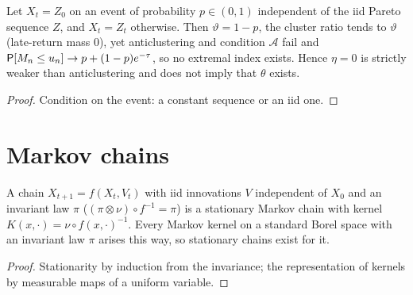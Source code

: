 \begin{proposition}
  \label{prop:mixture}
  \leanok
  Let $X_t = Z_0$ on an event of probability $p \in (0,1)$ independent of the iid Pareto sequence $Z$, and $X_t = Z_t$
  otherwise. Then $\vartheta = 1 - p$, the cluster ratio tends to $\vartheta$ (late-return mass $0$), yet anticlustering and
  condition $\mathcal A$ fail and $\mathsf{P}[M_n \le u_n] \to p + (1-p)e^{-\tau}$, so no extremal index exists. Hence $\eta = 0$ is
  strictly weaker than anticlustering and does not imply that $\theta$ exists.
\end{proposition}
\begin{proof}
  \leanok
  Condition on the event: a constant sequence or an iid one.
\end{proof}

\section{Markov chains}

\begin{theorem}
  \label{thm:markov-chain}
  \leanok
  A chain $X_{t+1} = f(X_t, V_t)$ with iid innovations $V$ independent of $X_0$ and an invariant law $\pi$ ($(\pi \otimes \nu)
  \circ f^{-1} = \pi$) is a stationary Markov chain with kernel $K(x, \cdot) = \nu \circ f(x, \cdot)^{-1}$. Every Markov kernel
  on a standard Borel space with an invariant law $\pi$ arises this way, so stationary chains exist for it.
\end{theorem}
\begin{proof}
  \leanok
  Stationarity by induction from the invariance; the representation of kernels by measurable maps of a
  uniform variable.
\end{proof}

